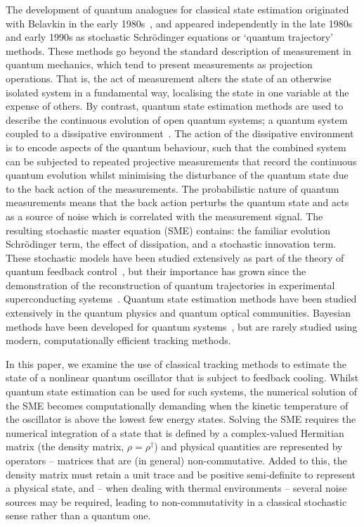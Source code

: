 \documentclass[conference]{IEEEtran}
\begin{document}
The development of quantum analogues for classical state estimation originated with Belavkin in the early 1980s~\cite{Bel1999}, and appeared independently in the late 1980s and early 1990s as stochastic Schr\"{o}dinger equations or `quantum trajectory' methods. These methods go beyond the standard description of measurement in quantum mechanics, which tend to present measurements as projection operations. That is, the act of measurement alters the state of an otherwise isolated system in a fundamental way, localising the state in one variable at the expense of others. By contrast, quantum state estimation methods are used to describe the continuous evolution of open quantum systems; a quantum system coupled to a dissipative environment~\cite{Wis2010,Jac2014}. The action of the dissipative environment is to encode aspects of the quantum behaviour, such that the combined system can be subjected to repeated projective measurements that record the continuous quantum evolution whilst minimising the disturbance of the quantum state due to the back action of the measurements. The probabilistic nature of quantum measurements means that the back action perturbs the quantum state and acts as a source of noise which is correlated with the measurement signal. The resulting stochastic master equation (SME) contains: the familiar evolution Schr\"{o}dinger term, the effect of dissipation, and a stochastic innovation term. These stochastic models have been studied extensively as part of the theory of quantum feedback control~\cite{Wis2010,Jac2014}, but their importance has grown since the demonstration of the reconstruction of quantum trajectories in experimental superconducting systems~\cite{Mur2013,Web2014,Six2015,Cam2016}. Quantum state estimation methods have been studied extensively in the quantum physics and quantum optical communities. Bayesian methods have been developed for quantum systems~\cite{Kor99}, but are rarely studied using modern, computationally efficient tracking methods. 

In this paper, we examine the use of classical tracking methods to estimate the state of a nonlinear quantum oscillator that is subject to feedback cooling. Whilst quantum state estimation can be used for such systems, the numerical solution of the SME becomes computationally demanding when the kinetic temperature of the oscillator is above the lowest few energy states. Solving the SME requires the numerical integration of a state that is defined by a complex-valued Hermitian matrix (the density matrix, $\rho = \rho^{\dagger}$) and physical quantities are represented by operators -- matrices that are (in general) non-commutative. Added to this, the density matrix must retain a unit trace and be positive semi-definite to represent a physical state, and -- when dealing with thermal environments -- several noise sources may be required, leading to non-commutativity in a classical stochastic sense rather than a quantum one. 
\end{document}
